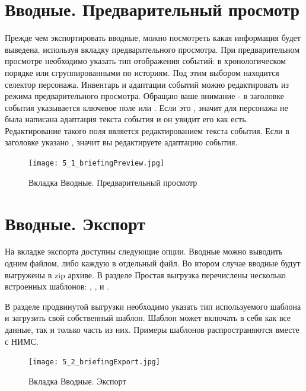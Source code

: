 \documentclass[a4paper,oneside,10pt,russian]{sphinxmanual}
\begin{document}
\section{Вводные. Предварительный просмотр}
\label{pages:breifings-preview}\label{pages:id12}
Прежде чем экспортировать вводные, можно посмотреть какая информация будет выведена, используя вкладку предварительного просмотра. При предварительном просмотре необходимо указать тип отображения событий: в хронологическом порядке или сгруппированными по историям. Под этим выбором находится селектор персонажа. Инвентарь и адаптации событий можно редактировать из режима предварительного просмотра. Обращаю ваше внимание - в заголовке события указывается ключевое поле  или . Если это , значит для персонажа не была написана адаптация текста события и он увидит его как есть. Редактирование такого поля является редактированием текста события. Если в заголовке указано , значит вы редактируете адаптацию события.
\begin{figure}[H]
\centering
\capstart

\texttt{[image: 5\_1\_briefingPreview.jpg]}
\caption{Вкладка Вводные. Предварительный просмотр}\end{figure}
\newpage

\section{Вводные. Экспорт}
\label{pages:id13}\label{pages:breifings-export}
На вкладке экспорта доступны следующие опции. Вводные можно выводить одним файлом, либо каждую в отдельный файл. Во втором случае вводные будут выгружены в zip архиве. В разделе Простая выгрузка перечислены несколько встроенных шаблонов: , ,  и .

В разделе продвинутой выгрузки необходимо указать тип используемого шаблона и загрузить свой собственный шаблон. Шаблон может включать в себя как все данные, так и только часть из них. Примеры шаблонов распространяются вместе с НИМС.
\begin{figure}[H]
\centering
\capstart

\texttt{[image: 5\_2\_briefingExport.jpg]}
\caption{Вкладка Вводные. Экспорт}\end{figure}
\newpage
\end{document}
